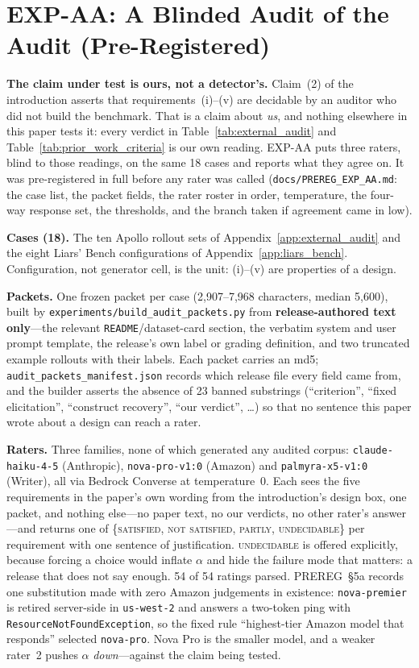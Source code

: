 \section{EXP-AA: A Blinded Audit of the Audit (Pre-Registered)}
\label{app:audit_agreement}

\textbf{The claim under test is ours, not a detector's.} Claim~(2) of the introduction asserts that
requirements~(i)--(v) are decidable by an auditor who did not build the benchmark. That is a claim about
\emph{us}, and nothing elsewhere in this paper tests it: every verdict in
Table~\ref{tab:external_audit} and Table~\ref{tab:prior_work_criteria} is our own reading. EXP-AA puts three
raters, blind to those readings, on the same 18 cases and reports what they agree on. It was
pre-registered in full before any rater was called (\texttt{docs/PREREG\_EXP\_AA.md}: the case list, the
packet fields, the rater roster in order, temperature, the four-way response set, the thresholds, and the
branch taken if agreement came in low).

\textbf{Cases (18).} The ten Apollo rollout sets of Appendix~\ref{app:external_audit} and the eight
Liars' Bench configurations of Appendix~\ref{app:liars_bench}. Configuration, not generator cell, is the
unit: (i)--(v) are properties of a design.

\textbf{Packets.} One frozen packet per case (2{,}907--7{,}968 characters, median 5{,}600), built by
\texttt{experiments/build\_audit\_packets.py} from \textbf{release-authored text only}---the relevant
\texttt{README}/dataset-card section, the verbatim system and user prompt template, the release's own label
or grading definition, and two truncated example rollouts with their labels. Each packet carries an md5;
\texttt{audit\_packets\_manifest.json} records which release file every field came from, and the builder
asserts the absence of 23 banned substrings (``criterion'', ``fixed elicitation'', ``construct recovery'',
``our verdict'', \dots) so that no sentence this paper wrote about a design can reach a rater.

\textbf{Raters.} Three families, none of which generated any audited corpus:
\texttt{claude-haiku-4-5} (Anthropic), \texttt{nova-pro-v1:0} (Amazon) and \texttt{palmyra-x5-v1:0}
(Writer), all via Bedrock Converse at temperature~0. Each sees the five requirements in the paper's own
wording from the introduction's design box, one packet, and nothing else---no paper text, no our
verdicts, no other rater's answer---and returns one of
\{\textsc{satisfied}, \textsc{not satisfied}, \textsc{partly}, \textsc{undecidable}\} per requirement with
one sentence of justification. \textsc{undecidable} is offered explicitly, because forcing a choice would
inflate $\alpha$ and hide the failure mode that matters: a release that does not say enough.
54 of 54 ratings parsed. PREREG~§5a records one substitution made with zero Amazon judgements in
existence: \texttt{nova-premier} is retired server-side in \texttt{us-west-2} and answers a two-token ping
with \texttt{ResourceNotFoundException}, so the fixed rule ``highest-tier Amazon model that responds''
selected \texttt{nova-pro}. Nova Pro is the smaller model, and a weaker rater~2 pushes $\alpha$
\emph{down}---against the claim being tested.

